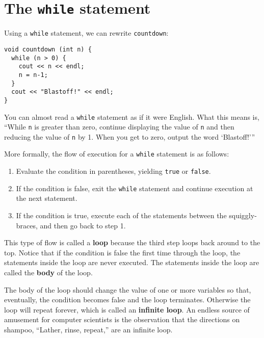 \section{The {\tt while} statement}

Using a {\tt while} statement, we can rewrite {\tt countdown}:

\begin{lstlisting}
void countdown (int n) {
  while (n > 0) {
    cout << n << endl;
    n = n-1;
  }
  cout << "Blastoff!" << endl;
}
\end{lstlisting}
%
You can almost read a {\tt while} statement as if it were
English.  What this means is, ``While {\tt n} is greater than
zero, continue displaying the value of {\tt n} and then reducing
the value of {\tt n} by 1.  When you get to zero, output the
word `Blastoff!'''

More formally, the flow of execution for a {\tt while} statement
is as follows:

\begin{enumerate}

\item Evaluate the condition in parentheses, yielding {\tt true}
or {\tt false}.

\item If the condition is false, exit the {\tt while} statement
and continue execution at the next statement.

\item If the condition is true, execute each of the statements
between the squiggly-braces, and then go back to step 1.

\end{enumerate}

This type of flow is called a {\bf loop} because the third step loops
back around to the top.  Notice that if the condition is false the
first time through the loop, the statements inside the loop are
never executed.  The statements inside the loop are called
the {\bf body} of the loop.


The body of the loop should change the value of
one or more variables so that, eventually, the condition becomes
false and the loop terminates.  Otherwise the loop will repeat
forever, which is called an {\bf infinite loop}.  An endless
source of amusement for computer scientists is the observation
that the directions on shampoo, ``Lather, rinse, repeat,'' are
an infinite loop.

